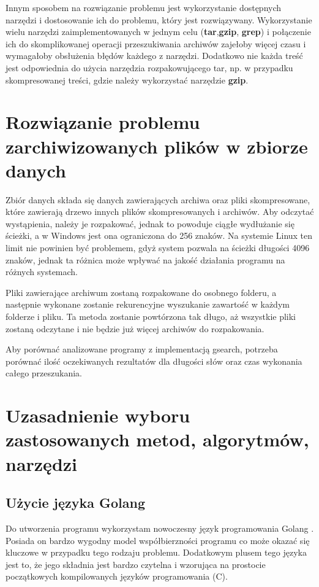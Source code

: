 Innym sposobem na rozwiązanie problemu jest wykorzystanie dostępnych narzędzi i
dostosowanie ich do problemu, który jest rozwiązywany. Wykorzystanie wielu narzędzi
zaimplementowanych w jednym celu (\textbf{tar},\textbf{gzip}, \textbf{grep}) i połączenie ich do 
skomplikowanej operacji przeszukiwania archiwów zajełoby więcej czasu
i wymagałoby obsłużenia błędów każdego z narzędzi. Dodatkowo nie każda treść
jest odpowiednia do użycia narzędzia rozpakowującego tar, np. w przypadku 
skompresowanej treści, gdzie należy wykorzystać narzędzie \textbf{gzip}.

\section{Rozwiązanie problemu zarchiwizowanych plików w zbiorze danych}

Zbiór danych składa się danych zawierających archiwa oraz pliki skompresowane,
które zawierają drzewo innych plików skompresowanych i archiwów.
Aby odczytać wystąpienia, należy je rozpakować, jednak to powoduje ciągłe 
wydłużanie się ścieżki, a w Windows jest ona ograniczona do 256 znaków. Na 
systemie Linux ten limit nie powinien być problemem, gdyż system pozwala na 
ścieżki długości 4096 znaków, jednak ta różnica może wpływać na jakość działania
programu na różnych systemach.

Pliki zawierające archiwum zostaną rozpakowane do osobnego folderu, a następnie
wykonane zostanie rekurencyjne wyszukanie zawartość w każdym folderze i pliku.
Ta metoda zostanie powtórzona tak długo, aż wszystkie pliki zostaną odczytane 
i nie będzie już więcej archiwów do rozpakowania.

Aby porównać analizowane programy z implementacją gsearch, potrzeba porównać
ilość oczekiwanych rezultatów dla długości słów oraz czas wykonania całego 
przeszukania.

\section{Uzasadnienie wyboru zastosowanych metod, algorytmów, narzędzi}

\subsection{Użycie języka Golang}

Do utworzenia programu wykorzystam nowoczesny język programowania Golang \cite{bib:internet:golang}.
Posiada on bardzo wygodny model współbierzności programu co może okazać się 
kluczowe w przypadku tego rodzaju problemu. Dodatkowym plusem tego języka jest
to, że jego składnia jest bardzo czytelna i wzorująca na prostocie początkowych
kompilowanych języków programowania (C).

